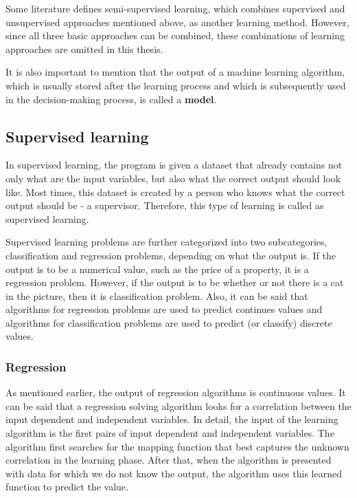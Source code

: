 Some literature\cite{ml-types1,ml-types2} defines semi-supervised learning, which combines supervised and unsupervised approaches mentioned above, as another learning method. However, since all three basic approaches can be combined, these combinations of learning approaches are omitted in this thesis.

It is also important to mention that the output of a machine learning algorithm, which is usually stored after the learning process and which is subsequently used in the decision-making process, is called a \textbf{model}\cite{algorithms-vs-models}.

\subsection{Supervised learning}


In supervised learning, the program is given a dataset that already contains not only what are the input variables, but also what the correct output should look like. Most times, this dataset is created by a person who knows what the correct output should be - a supervisor. Therefore, this type of learning is called as supervised learning.\cite{all-models}

Supervised learning problems are further categorized into two subcategories, classification and regression problems, depending on what the output is\cite{coursera-ml}. If the output is to be a numerical value, such as the price of a property, it is a regression problem. However, if the output is to be whether or not there is a cat in the picture, then it is classification problem. Also, it can be said that algorithms for regression problems are used to predict continues values and algorithms for classification problems are used to predict (or classify) discrete values.

\subsubsection{Regression}
As mentioned earlier, the output of regression algorithms is continuous values. It can be said that a regression solving algorithm looks for a correlation between the input dependent and independent variables. In detail, the input of the learning algorithm is the first pairs of input dependent and independent variables. The algorithm first searches for the mapping function that best captures the unknown correlation in the learning phase. After that, when the algorithm is presented with data for which we do not know the output, the algorithm uses this learned function to predict the value.

